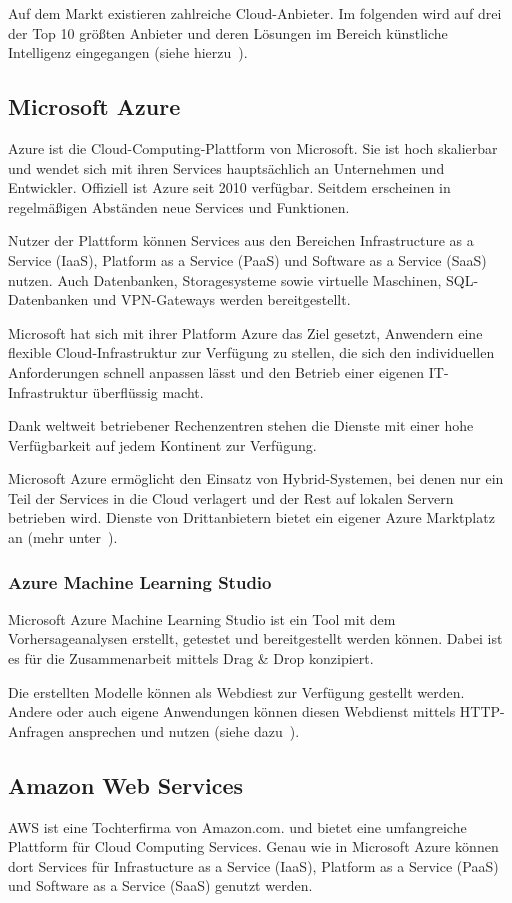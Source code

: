 Auf dem Markt existieren zahlreiche Cloud-Anbieter. Im folgenden wird auf drei der Top 10 größten Anbieter und deren
Lösungen im Bereich künstliche Intelligenz eingegangen (siehe hierzu~\cite{online_grundlagen_cloud}).

\subsection{Microsoft Azure}
Azure ist die Cloud-Computing-Plattform von Microsoft. Sie ist hoch skalierbar und wendet sich mit ihren Services
hauptsächlich an Unternehmen und Entwickler. Offiziell ist Azure seit 2010 verfügbar. Seitdem erscheinen in regelmäßigen
Abständen neue Services und Funktionen.

Nutzer der Plattform können Services aus den Bereichen Infrastructure as a Service (IaaS), Platform as a Service (PaaS)
und Software as a Service (SaaS) nutzen. Auch Datenbanken, Storagesysteme sowie virtuelle Maschinen, SQL-Datenbanken und
VPN-Gateways werden bereitgestellt.

Microsoft hat sich mit ihrer Platform Azure das Ziel gesetzt, Anwendern eine flexible Cloud-Infrastruktur zur Verfügung
zu stellen, die sich den individuellen Anforderungen schnell anpassen lässt und den Betrieb einer eigenen IT-Infrastruktur
überflüssig macht.

Dank weltweit betriebener Rechenzentren stehen die Dienste mit einer hohe Verfügbarkeit auf jedem Kontinent zur Verfügung.

Microsoft Azure ermöglicht den Einsatz von Hybrid-Systemen, bei denen nur ein Teil der Services in die Cloud verlagert
und der Rest auf lokalen Servern betrieben wird. Dienste von Drittanbietern bietet ein eigener Azure Marktplatz an
(mehr unter~\cite{online_grundlagen_azure}).

\subsubsection{Azure Machine Learning Studio}
Microsoft Azure Machine Learning Studio ist ein Tool mit dem Vorhersageanalysen erstellt, getestet und bereitgestellt
werden können. Dabei ist es für die Zusammenarbeit mittels Drag \& Drop konzipiert.

Die erstellten Modelle können als Webdiest zur Verfügung gestellt werden. Andere oder auch eigene Anwendungen können
diesen Webdienst mittels HTTP-Anfragen ansprechen und nutzen (siehe dazu~\cite{article_grundlagen_azure_studio}).

\subsection{Amazon Web Services}
AWS ist eine Tochterfirma von Amazon.com. und bietet eine umfangreiche Plattform für Cloud Computing Services. Genau
wie in Microsoft Azure können dort Services für Infrastucture as a Service (IaaS), Platform as a Service (PaaS) und
Software as a Service (SaaS) genutzt werden.

